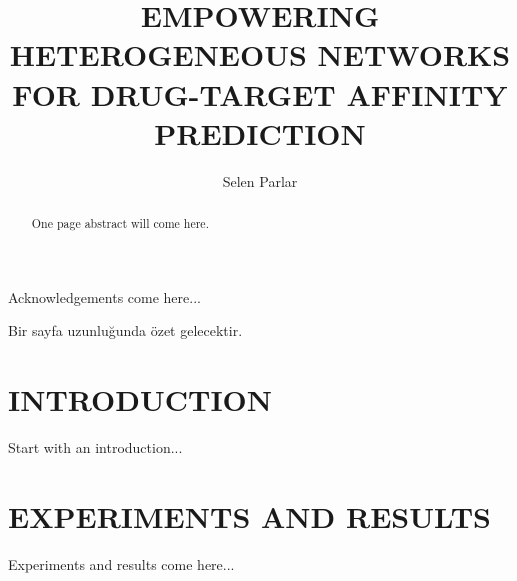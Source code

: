 \documentclass[a4paper,onesided,12pt]{report}
\title{EMPOWERING HETEROGENEOUS NETWORKS FOR DRUG-TARGET AFFINITY PREDICTION}
\author{Selen Parlar}
\begin{document}
\makemstitle %
\makeapprovalpage
\begin{acknowledgements}
Acknowledgements come here...
\end{acknowledgements}
\begin{abstract}
One page abstract will come here.  
\end{abstract}
\begin{ozet}
Bir sayfa uzunluğunda özet gelecektir.
\end{ozet}
\tableofcontents
\listoffigures
\listoftables
\begin{symbols}
%

\sym{}{}
\sym{ }{}

\end{symbols}

\begin{abbreviations}
\end{abbreviations}


\chapter{INTRODUCTION}
\label{chapter:introduction}
Start with an introduction...

%
\chapter{EXPERIMENTS AND RESULTS}
\label{chapter:experiments-and-results}

Experiments and results come here... 
\end{document}
